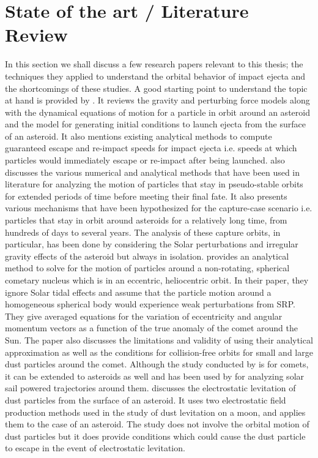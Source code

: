 \section{State of the art / Literature Review}
\label{sec:literature_review}
In this section we shall discuss a few research papers relevant to this thesis; the techniques they applied to understand the orbital behavior of impact ejecta and the shortcomings of these studies.
%
\newline\newline
%
A good starting point to understand the topic at hand is provided by \cite{scheeres2002fate}. It reviews the gravity and perturbing force models along with the dynamical equations of motion for a particle in orbit around an asteroid and the model for generating initial conditions to launch ejecta from the surface of an asteroid. It also mentions existing analytical methods to compute guaranteed escape and re-impact speeds for impact ejecta i.e. speeds at which particles would immediately escape or re-impact after being launched. \cite{scheeres2002fate} also discusses the various numerical and analytical methods that have been used in literature for analyzing the motion of particles that stay in pseudo-stable orbits for extended periods of time before meeting their final fate. It also presents various mechanisms that have been hypothesized for the capture-case scenario i.e. particles that stay in orbit around asteroids for a relatively long time, from hundreds of days to several years. The analysis of these capture orbits, in particular, has been done by considering the Solar perturbations and irregular gravity effects of the asteroid but always in isolation.
%
\newline\newline
%
\cite{richter1995stability} provides an analytical method to solve for the motion of particles around a non-rotating, spherical cometary nucleus which is in an eccentric, heliocentric orbit. In their paper, they ignore Solar tidal effects and assume that the particle motion around a homogeneous spherical body would experience weak perturbations from \gls{SRP}. They give averaged equations for the variation of eccentricity and angular momentum vectors as a function of the true anomaly of the comet around the Sun. The paper also discusses the limitations and validity of using their analytical approximation as well as the conditions for collision-free orbits for small and large dust particles around the comet. Although the study conducted by \cite{richter1995stability} is for comets, it can be extended to asteroids as well and has been used by \cite{morrow2001solar} for analyzing solar sail powered trajectories around them. \cite{lee1996dust} discusses the electrostatic levitation of dust particles from the surface of an asteroid. It uses two electrostatic field production methods used in the study of dust levitation on a moon, and applies them to the case of an asteroid. The study does not involve the orbital motion of dust particles but it does provide conditions which could cause the dust particle to escape in the event of electrostatic levitation.
